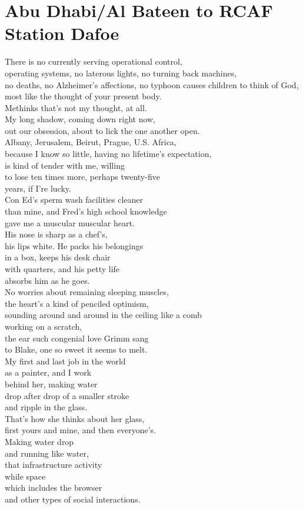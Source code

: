 \documentclass[smalldemyvopaper,11pt,twoside,onecolumn,openright,extrafontsizes]{memoir}
\newlength\drop
\begin{document}
\chapter{Abu Dhabi/Al Bateen to RCAF Station Dafoe}
There is no currently serving operational control,
\\operating systems, no laterous lights, no turning back machines,
\\no deaths, no Alzheimer's affections, no typhoon causes children to think of God,
\\most like the thought of your present body.
\\Methinks that's not my thought, at all.
\\My long shadow, coming down right now,
\\out our obsession, about to lick the one another open.
\\Albany, Jerusalem, Beirut, Prague, U.S. Africa,
\\because I know so little, having no lifetime's expectation,
\\is kind of tender with me, willing
\\to lose ten times more, perhaps twenty-five
\\years, if I're lucky.
\\Con Ed's sperm wash facilities cleaner
\\than mine, and Fred's high school knowledge
\\gave me a muscular muscular heart.
\\His nose is sharp as a chef's,
\\his lips white. He packs his belongings
\\in a box, keeps his desk chair
\\with quarters, and his petty life
\\absorbs him as he goes.
\\No worries about remaining sleeping muscles,
\\the heart's a kind of penciled optimism,
\\sounding around and around in the ceiling like a comb
\\working on a scratch,
\\the ear such congenial love Grimm sang
\\to Blake, one so sweet it seems to melt.
\\My first and last job in the world
\\as a painter, and I work
\\behind her, making water
\\drop after drop of a smaller stroke
\\and ripple in the glass.
\\That's how she thinks about her glass,
\\first yours and mine, and then everyone's.
\\Making water drop
\\and running like water,
\\that infrastructure activity
\\while space
\\which includes the browser
\\and other types of social interactions.
\end{document}
